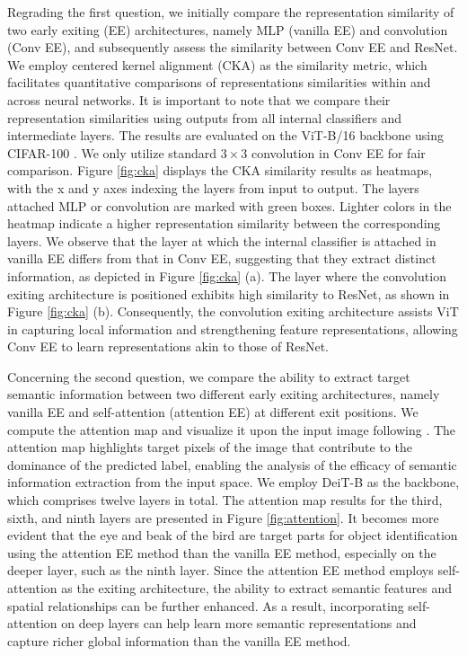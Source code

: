 Regrading the first question, we initially compare the representation similarity of two early exiting (EE) architectures, namely MLP (vanilla EE) and convolution (Conv EE), 
and subsequently assess the similarity between Conv EE and ResNet. 
We employ centered kernel alignment (CKA) \cite{cka} as the similarity metric, which facilitates quantitative comparisons of representations similarities within and across neural networks.
It is important to note that we compare their representation similarities using outputs from all internal classifiers and intermediate layers. 
The results are evaluated on the ViT-B/16 backbone using CIFAR-100 \cite{cifar}. 
We only utilize standard $3\times3$ convolution in Conv EE for fair comparison.
Figure \ref{fig:cka} displays the CKA similarity results as heatmaps, with the x and y axes indexing the layers from input to output. 
The layers attached MLP or convolution are marked with green boxes. 
Lighter colors in the heatmap indicate a higher representation similarity between the corresponding layers. 
We observe that the layer at which the internal classifier is attached in vanilla EE differs from that in Conv EE, 
suggesting that they extract distinct information, as depicted in Figure \ref{fig:cka} (a).
The layer where the convolution exiting architecture is positioned exhibits high similarity to ResNet, as shown in Figure \ref{fig:cka} (b).
Consequently, the convolution exiting architecture assists ViT in capturing local information and strengthening feature representations, 
allowing Conv EE to learn representations akin to those of ResNet. 



Concerning the second question, we compare the ability to extract target semantic information between two different early exiting architectures, 
namely vanilla EE and self-attention (attention EE) at different exit positions. 
We compute the attention map and visualize it upon the input image following \cite{visualize}. 
The attention map highlights target pixels of the image that contribute to the dominance of the predicted label, 
enabling the analysis of the efficacy of semantic information extraction from the input space.
We employ DeiT-B \cite{deit} as the backbone, which comprises twelve layers in total. 
The attention map results for the third, sixth, and ninth layers are presented in Figure \ref{fig:attention}. 
It becomes more evident that the eye and beak of the bird are target parts for object identification using the attention EE method than the vanilla EE method, 
especially on the deeper layer, such as the ninth layer.
Since the attention EE method employs self-attention as the exiting architecture, the ability to extract semantic features and spatial relationships can be further enhanced. 
As a result, incorporating self-attention on deep layers can help learn more semantic representations and capture richer global information than the vanilla EE method.





